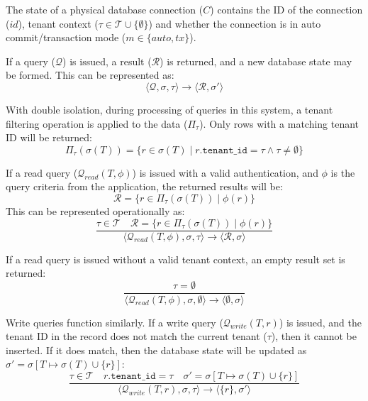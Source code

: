 \documentclass[conference]{IEEEtran}
\begin{document}
The state of a physical database connection ($C$) contains the ID of the connection ($\mathit{id}$), tenant context ($\tau \in \mathcal{T} \cup \{\emptyset\}$) and whether the connection is in auto commit/transaction mode ($m \in \{\mathit{auto}, \mathit{tx}\}$).

If a query ($\mathcal{Q}$) is issued, a result ($\mathcal{R}$) is returned, and a new database state may be formed. This can be represented as:
\begin{equation}
\langle \mathcal{Q}, \sigma, \tau \rangle \to \langle \mathcal{R}, \sigma' \rangle
\end{equation}

With double isolation, during processing of queries in this system, a tenant filtering operation is applied to the data ($\Pi_\tau$). Only rows with a matching tenant ID will be returned:
\begin{equation}
\Pi_\tau(\sigma(T)) = \{ r \in \sigma(T) \mid r.\texttt{tenant\_id} = \tau \land \tau \neq \emptyset \}
\end{equation}

If a read query ($\mathcal{Q}_{\mathit{read}}(T, \phi)$) is issued with a valid authentication, and $\phi$ is the query criteria from the application, the returned results will be:
\begin{equation}
\mathcal{R} = \{ r \in \Pi_\tau(\sigma(T)) \mid \phi(r) \}
\end{equation}
This can be represented operationally as:
\begin{equation}
\frac{\tau \in \mathcal{T} \quad \mathcal{R} = \{ r \in \Pi_\tau(\sigma(T)) \mid \phi(r) \}}{\langle \mathcal{Q}_{\mathit{read}}(T, \phi), \sigma, \tau \rangle \to \langle \mathcal{R}, \sigma \rangle}
\end{equation}

If a read query is issued without a valid tenant context, an empty result set is returned:
\begin{equation}
\frac{\tau = \emptyset}{\langle \mathcal{Q}_{\mathit{read}}(T, \phi), \sigma, \emptyset \rangle \to \langle \emptyset, \sigma \rangle}
\end{equation}

Write queries function similarly. If a write query ($\mathcal{Q}_{\mathit{write}}(T, r)$) is issued, and the tenant ID in the record does not match the current tenant ($\tau$), then it cannot be inserted. If it does match, then the database state will be updated as $\sigma' = \sigma[T \mapsto \sigma(T) \cup \{r\}]$:
\begin{equation}
\frac{\tau \in \mathcal{T} \quad r.\texttt{tenant\_id} = \tau \quad \sigma' = \sigma[T \mapsto \sigma(T) \cup \{r\}]}{\langle \mathcal{Q}_{\mathit{write}}(T, r), \sigma, \tau \rangle \to \langle \{r\}, \sigma' \rangle}
\end{equation}
\end{document}
